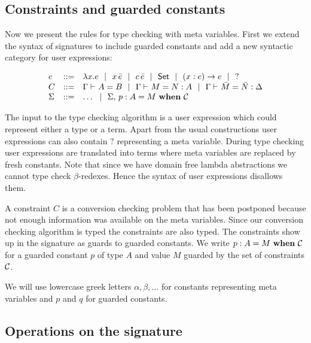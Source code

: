 \subsection{Constraints and guarded constants}

Now we present the rules for type checking with meta variables. First we extend
the syntax of signatures to include guarded constants and add a new syntactic
category for user expressions:

\[\begin{array}{lcll}
    e & ::= & \lambda x.{}e ~~|~~ x\,\bar e ~~|~~ c\,\bar e ~~|~~ \mathsf{Set} ~~|~~ (x:e)\to{}e ~~|~~ ? \\
    C & ::= & {\Gamma} \vdash_{}A=B ~~|~~ {\Gamma} \vdash_{}M=N:A ~~|~~
	      {\Gamma} \vdash_{}\bar M=\bar N:\Delta \\
    \Sigma & ::= & \ldots ~~|~~
		{\Sigma},\,{} {p} : {A} = {M} ~\mathbf{when}~ {\mathcal{C}} \\
\end{array}\]

The input to the type checking algorithm is a user expression which could
represent either a type or a term. Apart from the usual constructions user
expressions can also contain $?$ representing a meta variable. During type
checking user expressions are translated into {\Core} terms where meta
variables are replaced by fresh constants. Note that since we have domain free
lambda abstractions we cannot type check $\beta$-redexes. Hence the syntax of
user expressions disallows them.

A constraint $C$ is a conversion checking problem that has been postponed
because not enough information was available on the meta variables. Since our
conversion checking algorithm is typed the constraints are also typed. The
constraints show up in the signature as guards to guarded constants. We write
${p} : {A} = {M} ~\mathbf{when}~ {\mathcal{C}}$ for a guarded constant $p$ of type $A$ and value $M$
guarded by the set of constraints $\mathcal{C}$.

We will use lowercase greek letters $\alpha, \beta, \ldots$ for constants
representing meta variables and $p$ and $q$ for guarded constants.

\subsection{Operations on the signature}

